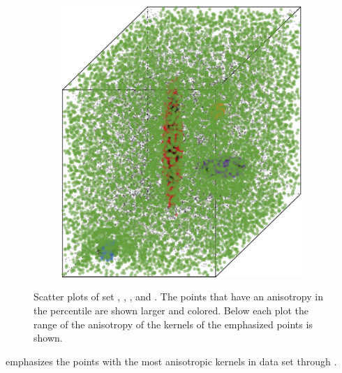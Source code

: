 \begin{figure}
\begin{subfigure}{0.23\textwidth}
				\caption{}
				\label{fig:discussion:anisotropy:ferdosi3}
			\end{subfigure}		
			\begin{subfigure}{0.23\textwidth}
				\centering
				\includegraphics[keepaspectratio=true, width=\textwidth, height=0.23\textheight]{discussion/img/baakman_3_60000_anisotropy.png}
				\caption{}
				\label{fig:discussion:anisotropy:baakman3}
			\end{subfigure}			
			\caption{Scatter plots of set
				 \ferdosiTwo, %
				 \baakmanTwo, %
				 \ferdosiThree, and %
				 \baakmanThree. %
				The points that have an anisotropy in the  percentile are shown larger and colored. Below each plot the range of the anisotropy of the kernels of the emphasized points is shown.}
			\label{fig:discussion:anisotropy:multisphere}
		\end{figure}			
		 emphasizes the points with the most anisotropic kernels in data set \ferdosiTwo through \baakmanThree. 
